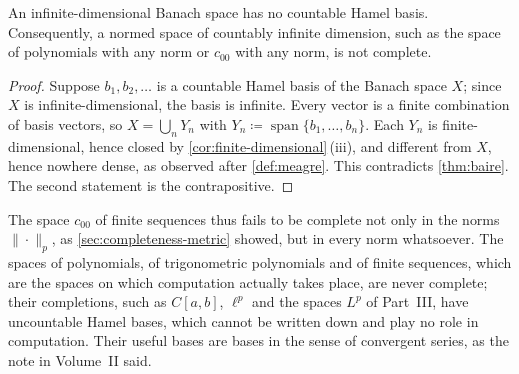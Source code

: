 \begin{theorem}
\label{thm:hamel-uncountable}
An infinite-dimensional Banach space has no countable Hamel basis. Consequently, a normed space of countably infinite dimension, such as the space of polynomials with any norm or $c_{00}$ with any norm, is not complete.
\end{theorem}

\begin{proof}
Suppose $b_1,b_2,\ldots$ is a countable Hamel basis of the Banach space $X$; since $X$ is infinite-dimensional, the basis is infinite. Every vector is a finite combination of basis vectors, so $X=\bigcup_nY_n$ with $Y_n\coloneqq\operatorname{span}\{b_1,\ldots,b_n\}$. Each $Y_n$ is finite-dimensional, hence closed by \cref{cor:finite-dimensional}\,(iii), and different from $X$, hence nowhere dense, as observed after \cref{def:meagre}. This contradicts \cref{thm:baire}. The second statement is the contrapositive.
\end{proof}

The space $c_{00}$ of finite sequences thus fails to be complete not only in the norms $\|\cdot\|_p$, as \cref{sec:completeness-metric} showed, but in every norm whatsoever. The spaces of polynomials, of trigonometric polynomials and of finite sequences, which are the spaces on which computation actually takes place, are never complete; their completions, such as $C[a,b]$, $\ell^p$ and the spaces $L^p$ of Part~III, have uncountable Hamel bases, which cannot be written down and play no role in computation. Their useful bases are bases in the sense of convergent series, as the note in Volume~II said.

